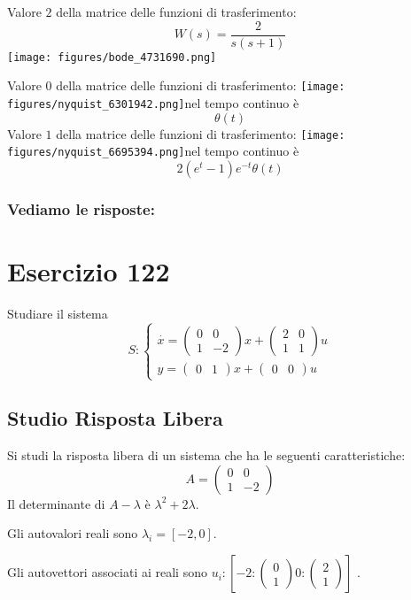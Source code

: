 \documentclass{article}
\begin{document}
Valore $ 2 $ della matrice delle funzioni di trasferimento:
\[ W(s) = \frac{2}{s \left(s + 1\right)} \]\texttt{[image: figures/bode\_4731690.png]}


Valore $ 0 $ della matrice delle funzioni di trasferimento:
\texttt{[image: figures/nyquist\_6301942.png]}nel tempo continuo è \[ \theta\left(t\right) \]
Valore $ 1 $ della matrice delle funzioni di trasferimento:
\texttt{[image: figures/nyquist\_6695394.png]}nel tempo continuo è \[ 2 \left(e^{t} - 1\right) e^{- t} \theta\left(t\right) \]
\subsubsection{Vediamo le risposte:} 
\section{Esercizio 122 }
 Studiare il sistema \[S:\begin{cases}\overset{\cdot}{x} = \left(\begin{matrix}0 & 0\\1 & -2\end{matrix}\right) x+ \left(\begin{matrix}2 & 0\\1 & 1\end{matrix}\right)u\\y = \left(\begin{matrix}0 & 1\end{matrix}\right) x +\left(\begin{matrix}0 & 0\end{matrix}\right) u\end{cases}\]\subsection{Studio Risposta Libera}
Si studi la risposta libera di un sistema che ha le seguenti caratteristiche: \[A = \left(\begin{matrix}0 & 0\\1 & -2\end{matrix}\right)\]
Il determinante di $A-\lambda$ è $ \lambda^{2} + 2 \lambda $.

Gli autovalori reali sono $\lambda_i = [-2, 0]$.

Gli autovettori associati ai reali sono $ u_i: [  -2: \left(\begin{matrix}0\\1\end{matrix}\right)0: \left(\begin{matrix}2\\1\end{matrix}\right) ]$
.
\end{document}
